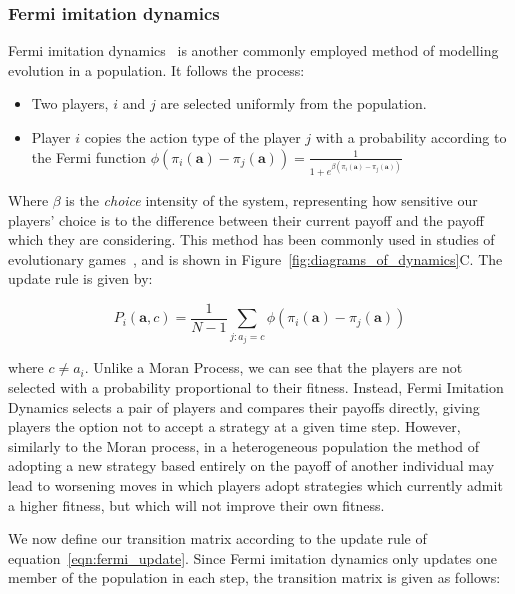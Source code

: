\documentclass{article}
\begin{document}
\subsubsection{Fermi imitation dynamics}

Fermi imitation dynamics~\cite{PhysRevE.58.69} is another commonly employed
method of modelling evolution in a population. It follows the process:

\begin{itemize}
  \item Two players, \(i\) and \(j\) are selected uniformly from the population.
  \item Player \(i\) copies the action type of the player \(j\) with a
  probability according to the Fermi function \(\phi(\pi_{i}(\mathbf{a}) -
  \pi_{j}(\mathbf{a})) = \frac{1}{1 + e^{\beta(\pi_{i}(\mathbf{a}) -
  \pi_{j}(\mathbf{a}))}}\)
\end{itemize}

Where \(\beta\) is the \emph{choice} intensity of the system, representing how
sensitive our players' choice is to the difference between their current payoff
and the payoff which they are considering. This method has been commonly used in
studies of evolutionary games~\cite{LEI20104708,MA2021111353,PhysRevE.58.69},
and is shown in Figure~\ref{fig:diagrams_of_dynamics}C. The update rule is given
by:

\begin{equation}
    P_i(\mathbf{a}, c) = \frac{1}{N-1}\sum_{j:a_j = c}\phi(\pi_{i}(\mathbf{a}) - \pi_{j}(\mathbf{a}))
    \label{eqn:fermi_update}
\end{equation}

where \(c \neq a_i\). Unlike a Moran Process, we can see that the players are
not selected with a probability proportional to their fitness. Instead, Fermi
Imitation Dynamics selects a pair of players and compares their payoffs
directly, giving players the option not to accept a strategy at a given time
step. However, similarly to the Moran process, in a heterogeneous population the
method of adopting a new strategy based entirely on the payoff of another
individual may lead to worsening moves in which players adopt strategies which
currently admit a higher fitness, but which will not improve their own fitness.

We now define our transition matrix according to the update rule of
equation~\eqref{eqn:fermi_update}. Since Fermi imitation dynamics only updates
one member of the population in each step, the transition matrix is given as
follows:
\end{document}
